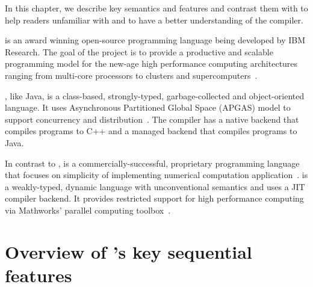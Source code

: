
In this chapter, we describe key \xten semantics and features and contrast 
them with \matlab to help readers unfamiliar with \xten and \matlab to
have a better understanding of the \mixten compiler.   

\xten is an award winning open-source programming language being developed by
IBM Research. The goal of the \xten project is to provide a productive and
scalable programming model for the new-age high performance computing
architectures ranging from multi-core processors to clusters and
supercomputers~\cite{}. 

\xten, like Java, is a class-based, strongly-typed, garbage-collected and
object-oriented language. It uses Asynchronous Partitioned Global Space (APGAS)
model to support concurrency and distribution~\cite{}. The \xten compiler has a
native backend that compiles \xten programs to C++ and a managed backend that
compiles \xten programs to Java. 

In contrast to \xten, \matlab is a commercially-successful, proprietary
programming language that focuses on simplicity of implementing numerical
computation application~\cite{}. \matlab is a weakly-typed, dynamic language
with unconventional semantics and uses a JIT compiler backend.
It provides restricted support for high performance
computing via Mathworks' parallel computing toolbox~\cite{}. 

\section{Overview of \xten's key sequential features}

